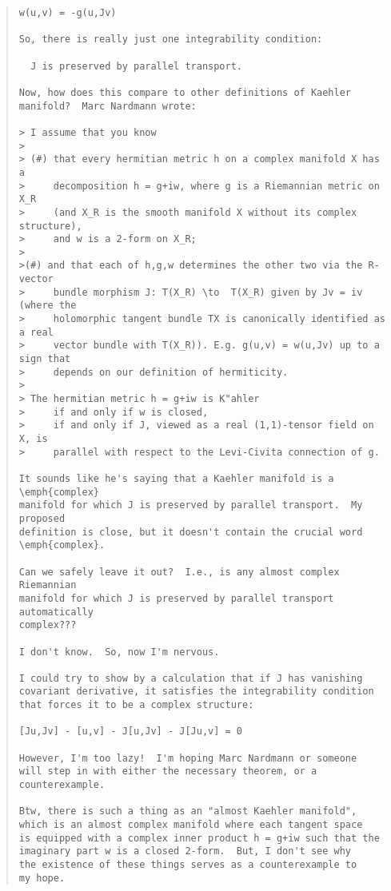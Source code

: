 \begin{quote}
\begin{verbatim}
w(u,v) = -g(u,Jv)

So, there is really just one integrability condition:

  J is preserved by parallel transport.

Now, how does this compare to other definitions of Kaehler
manifold?  Marc Nardmann wrote:

> I assume that you know
>
> (#) that every hermitian metric h on a complex manifold X has a
>     decomposition h = g+iw, where g is a Riemannian metric on X_R
>     (and X_R is the smooth manifold X without its complex structure),
>     and w is a 2-form on X_R;
>
>(#) and that each of h,g,w determines the other two via the R-vector
>     bundle morphism J: T(X_R) \to  T(X_R) given by Jv = iv (where the
>     holomorphic tangent bundle TX is canonically identified as a real
>     vector bundle with T(X_R)). E.g. g(u,v) = w(u,Jv) up to a sign that
>     depends on our definition of hermiticity.
>
> The hermitian metric h = g+iw is K"ahler
>     if and only if w is closed,
>     if and only if J, viewed as a real (1,1)-tensor field on X, is
>     parallel with respect to the Levi-Civita connection of g.

It sounds like he's saying that a Kaehler manifold is a \emph{complex}
manifold for which J is preserved by parallel transport.  My proposed
definition is close, but it doesn't contain the crucial word \emph{complex}.

Can we safely leave it out?  I.e., is any almost complex Riemannian
manifold for which J is preserved by parallel transport automatically
complex???

I don't know.  So, now I'm nervous.

I could try to show by a calculation that if J has vanishing
covariant derivative, it satisfies the integrability condition
that forces it to be a complex structure:

[Ju,Jv] - [u,v] - J[u,Jv] - J[Ju,v] = 0

However, I'm too lazy!  I'm hoping Marc Nardmann or someone 
will step in with either the necessary theorem, or a counterexample.

Btw, there is such a thing as an "almost Kaehler manifold",
which is an almost complex manifold where each tangent space
is equipped with a complex inner product h = g+iw such that the
imaginary part w is a closed 2-form.  But, I don't see why
the existence of these things serves as a counterexample to
my hope.
\end{verbatim}
    
\end{quote}


